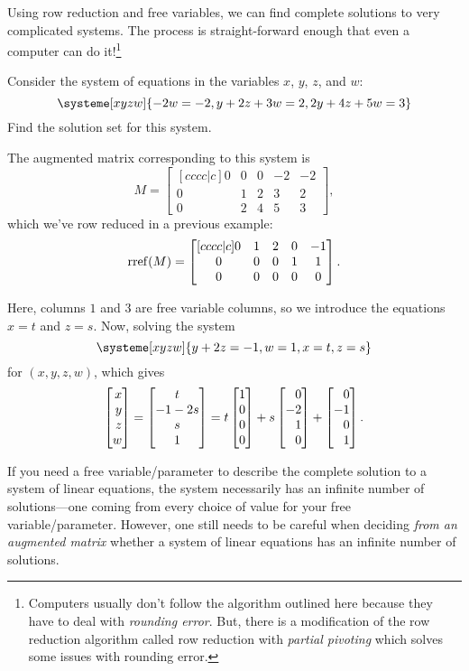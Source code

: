 	\medskip
	Using row reduction and free variables, we can find complete solutions to very complicated systems.
	The process is straight-forward enough that even a computer can do it!\footnote{
		Computers usually don't follow the algorithm outlined here because they have
		to deal with \emph{rounding error}. But, there is a modification of the row
		reduction algorithm called row reduction with \emph{partial pivoting} which
		solves some issues with rounding error.
	}

	\begin{example}
		Consider the system of equations in the variables $x$, $y$, $z$, and $w$:
		\[
			\systeme[xyzw]{-2w=-2,y+2z+3w=2,2y+4z+5w=3}
		\]
		Find the solution set for this system.

		The augmented matrix corresponding to this system is
		\[
			M=\begin{bmatrix}[cccc|c]0&0&0&-2&-2\\0&1&2&3&2\\0&2&4&5&3\end{bmatrix},
		\]
		which we've row reduced in a previous example:
		\[
			\operatorname{rref}(M) = 
			\begin{bmatrix}[cccc|c]
				0&1&2&0&-1\\
				0&0&0&1&1\\0&0&0&0&0
			\end{bmatrix}.
		\]

		Here, columns $1$ and $3$ are free variable columns, so we introduce the equations $x=t$ and $z=s$.
		Now, solving the system
		\[
			\systeme[xyzw]{y+2z=-1,w=1,x=t,z=s}
		\]
		for $(x,y,z,w)$, which gives
		\[
			\mat{x\\y\\z\\w} = \matc{t\\-1-2s\\s\\1} = t\mat{1\\0\\0\\0}+s\mat{0\\-2\\1\\0}+\mat{0\\-1\\0\\1}.
		\]
	\end{example}


	If you need a free variable/parameter to describe the complete solution to a system of linear equations,
	the system necessarily has an infinite number of solutions---one coming from every choice of value for your
	free variable/parameter. However, one still needs to be careful when deciding \emph{from an augmented matrix}
	whether a system of linear equations has an infinite number of solutions.

